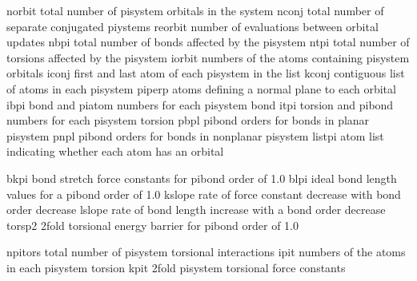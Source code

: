 \documentclass[letterpaper,11pt,english]{sphinxmanual}
\begin{document}
\begin{sphinxVerbatim}[commandchars=\\\{\}]
norbit          total number of pisystem orbitals in the system
nconj           total number of separate conjugated piystems
reorbit         number of evaluations between orbital updates
nbpi            total number of bonds affected by the pisystem
ntpi            total number of torsions affected by the pisystem
iorbit          numbers of the atoms containing pisystem orbitals
iconj           first and last atom of each pisystem in the list
kconj           contiguous list of atoms in each pisystem
piperp          atoms defining a normal plane to each orbital
ibpi            bond and piatom numbers for each pisystem bond
itpi            torsion and pibond numbers for each pisystem torsion
pbpl            pi\PYGZhy{}bond orders for bonds in \PYGZdq{}planar\PYGZdq{} pisystem
pnpl            pi\PYGZhy{}bond orders for bonds in \PYGZdq{}nonplanar\PYGZdq{} pisystem
listpi          atom list indicating whether each atom has an orbital
\end{sphinxVerbatim}

\sphinxAtStartPar
{}

\begin{sphinxVerbatim}[commandchars=\\\{\}]
bkpi            bond stretch force constants for pi\PYGZhy{}bond order of 1.0
blpi            ideal bond length values for a pi\PYGZhy{}bond order of 1.0
kslope          rate of force constant decrease with bond order decrease
lslope          rate of bond length increase with a bond order decrease
torsp2          2\PYGZhy{}fold torsional energy barrier for pi\PYGZhy{}bond order of 1.0
\end{sphinxVerbatim}

\sphinxAtStartPar
{}

\begin{sphinxVerbatim}[commandchars=\\\{\}]
npitors         total number of pi\PYGZhy{}system torsional interactions
ipit            numbers of the atoms in each pi\PYGZhy{}system torsion
kpit            2\PYGZhy{}fold pi\PYGZhy{}system torsional force constants
\end{sphinxVerbatim}

\sphinxAtStartPar
{}
\end{document}
